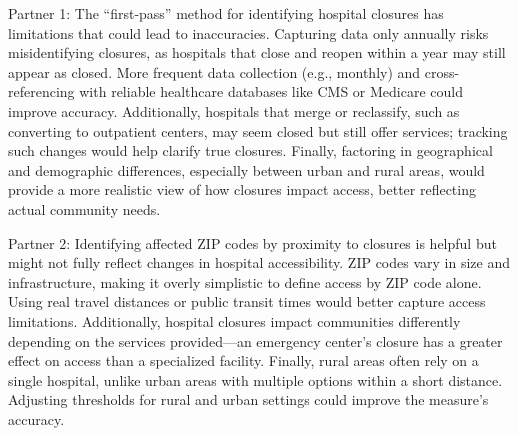 \documentclass[
  letterpaper,
  DIV=11,
  numbers=noendperiod]{scrartcl}
\begin{document}
Partner 1: The ``first-pass'' method for identifying hospital closures
has limitations that could lead to inaccuracies. Capturing data only
annually risks misidentifying closures, as hospitals that close and
reopen within a year may still appear as closed. More frequent data
collection (e.g., monthly) and cross-referencing with reliable
healthcare databases like CMS or Medicare could improve accuracy.
Additionally, hospitals that merge or reclassify, such as converting to
outpatient centers, may seem closed but still offer services; tracking
such changes would help clarify true closures. Finally, factoring in
geographical and demographic differences, especially between urban and
rural areas, would provide a more realistic view of how closures impact
access, better reflecting actual community needs.

Partner 2: Identifying affected ZIP codes by proximity to closures is
helpful but might not fully reflect changes in hospital accessibility.
ZIP codes vary in size and infrastructure, making it overly simplistic
to define access by ZIP code alone. Using real travel distances or
public transit times would better capture access limitations.
Additionally, hospital closures impact communities differently depending
on the services provided---an emergency center's closure has a greater
effect on access than a specialized facility. Finally, rural areas often
rely on a single hospital, unlike urban areas with multiple options
within a short distance. Adjusting thresholds for rural and urban
settings could improve the measure's accuracy.
\end{document}
